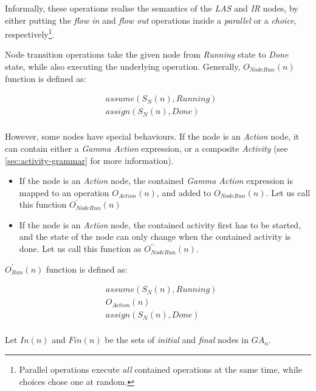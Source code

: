 Informally, these operations realise the semantics of the \emph{LAS} and \emph{IR} nodes, by either putting the \emph{flow in} and \emph{flow out} operations inside a \emph{parallel} or a \emph{choice}, respectively\footnote{Parallel operations execute \emph{all} contained operations at the same time, while choices chose one at random.}.

\begin{definition}
	Node transition operations take the given node from \emph{Running} state to \emph{Done} state, while also executing the underlying operation. Generally, \(O_\mathit{NodeRun}(n)\) function is defined as:
	
	\begin{align*}
		&\mathit{assume}(S_N(n), \mathit{Running}) \\
		&\mathit{assign}(S_N(n), \mathit{Done}) \\
	\end{align*}

	However, some nodes have special behaviours. If the node is an \emph{Action} node, it can contain either a \emph{Gamma Action} expression, or a composite \emph{Activity} (see \autoref{sec:activity-grammar} for more information).

	\begin{itemize}
		\item If the node is an \emph{Action} node, the contained \emph{Gamma Action} expression is mapped to an operation \(O_\mathit{Action}(n)\), and added to \( O_\mathit{NodeRun}(n) \). Let us call this function \(O_\mathit{NodeRun}^\prime(n)\)
		\item If the node is an \emph{Action} node, the contained activity first has to be started, and the state of the node can only change when the contained activity is done. Let us call this function as \(O_\mathit{NodeRun}^{\prime\prime}(n)\).
	\end{itemize}

	\(O_\mathit{Run}^\prime(n)\) function is defined as:
	
	\begin{align*}
		&\mathit{assume}(S_N(n), \mathit{Running}) \\
		&O_\mathit{Action}(n) \\
		&\mathit{assign}(S_N(n), \mathit{Done}) \\
	\end{align*}

	Let \(\mathit{In}(n)\) and \(\mathit{Fin}(n)\) be the sets of \emph{initial} and \emph{final} nodes in \(\mathit{GA}_\mathit{n}\). 
	

\end{definition}
